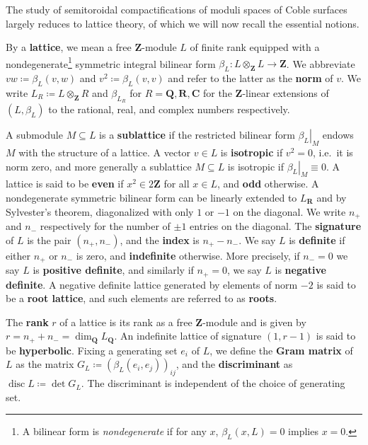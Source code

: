 \documentclass{amsart}
\begin{document}
\begin{remark}

The study of semitoroidal compactifications of moduli spaces of Coble surfaces largely reduces to lattice theory, of which we will now recall the essential notions.

\end{remark}

\begin{remark}

By a \textbf{lattice}, we mean a free \({\mathbf{Z}}\)-module \(L\) of finite rank equipped with a nondegenerate\footnote{A bilinear form is \emph{nondegenerate} if for any \(x\), \(\beta_L(x, L) = 0\) implies \(x=0\).} symmetric integral bilinear form \(\beta_L: L \otimes_{\mathbf{Z}}L \to {\mathbf{Z}}\). We abbreviate \(vw \coloneqq\beta_L(v, w)\) and \(v^2 \coloneqq\beta_L(v, v)\) and refer to the latter as the \textbf{norm} of \(v\). We write \(L_R \coloneqq L\otimes_{{\mathbf{Z}}} R\) and \(\beta_{L_R}\) for \(R = {\mathbf{Q}}, {\mathbf{R}}, {\mathbf{C}}\) for the \({\mathbf{Z}}\)-linear extensions of \((L, \beta_L)\) to the rational, real, and complex numbers respectively.

A submodule \(M\subseteq L\) is a \textbf{sublattice} if the restricted bilinear form \({ \left.{{\beta_L}} \right|_{{M}} }\) endows \(M\) with the structure of a lattice. A vector \(v\in L\) is \textbf{isotropic} if \(v^2 = 0\), i.e.~it is norm zero, and more generally a sublattice \(M \subseteq L\) is isotropic if \({ \left.{{\beta_L}} \right|_{{M}} } \equiv 0\). A lattice is said to be \textbf{even} if \(x^2\in 2{\mathbf{Z}}\) for all \(x\in L\), and \textbf{odd} otherwise. A nondegenerate symmetric bilinear form can be linearly extended to \(L_{\mathbf{R}}\) and by Sylvester's theorem, diagonalized with only \(1\) or \(-1\) on the diagonal. We write \(n_+\) and \(n_-\) respectively for the number of \(\pm 1\) entries on the diagonal. The \textbf{signature} of \(L\) is the pair \((n_+, n_-)\), and the \textbf{index} is \(n_+ - n_-\). We say \(L\) is \textbf{definite} if either \(n_+\) or \(n_-\) is zero, and \textbf{indefinite} otherwise. More precisely, if \(n_- = 0\) we say \(L\) is \textbf{positive definite}, and similarly if \(n_+ = 0\), we say \(L\) is \textbf{negative definite}. A negative definite lattice generated by elements of norm \(-2\) is said to be a \textbf{root lattice}, and such elements are referred to as \textbf{roots}.

The \textbf{rank} \(r\) of a lattice is its rank as a free \({\mathbf{Z}}\)-module and is given by \(r=n_+ + n_- = \dim_{\mathbf{Q}}L_{\mathbf{Q}}\). An indefinite lattice of signature \((1, r-1)\) is said to be \textbf{hyperbolic}. Fixing a generating set \(e_i\) of \(L\), we define the \textbf{Gram matrix} of \(L\) as the matrix \(G_L \coloneqq(\beta_L(e_i, e_j))_{ij}\), and the \textbf{discriminant} as \(\operatorname{disc} L \coloneqq\operatorname{det}G_L\). The discriminant is independent of the choice of generating set.

\end{remark}
\end{document}
